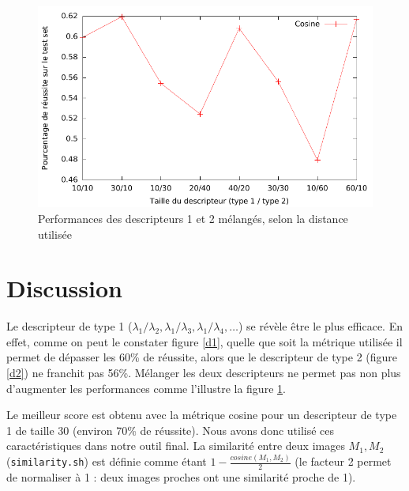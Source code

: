 \documentclass[a4paper,10pt]{article} %
\theoremstyle{definition} %
\begin{document}
\begin{figure}[H]
  \includegraphics[scale=1.15]{../plot/courbe3.pdf}
\caption{Performances des descripteurs 1 et 2 mélangés, selon la distance utilisée}
\label{d3}
\end{figure}


\section{Discussion}

Le descripteur de type 1 ($\lambda_1/\lambda_2, \lambda_1/\lambda_3, \lambda_1/\lambda_4, \dots$) se révèle être le plus efficace. En effet, comme on peut le constater figure \ref{d1}, quelle que soit la métrique utilisée il permet de dépasser les 60\% de réussite, alors que le descripteur de type 2 (figure \ref{d2}) ne franchit pas 56\%. Mélanger les deux descripteurs ne permet pas non plus d'augmenter les performances comme l'illustre la figure \ref{d3}.

Le meilleur score est obtenu avec la métrique cosine pour un descripteur de type 1 de taille 30 (environ 70\% de réussite). Nous avons donc utilisé ces caractéristiques dans notre outil final. La similarité entre deux images $M_1, M_2$ (\texttt{similarity.sh}) est définie comme étant $1 - \frac{cosine(M_1,M_2)}{2}$ (le facteur 2 permet de normaliser à 1 : deux images proches ont une similarité proche de 1).
\end{document}
